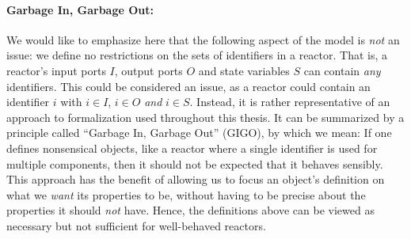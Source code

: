 \paragraph{Garbage In, Garbage Out:} 
We would like to emphasize here that the following aspect of the model is \emph{not} an issue:
we define no restrictions on the sets of identifiers in a reactor.
That is, a reactor's input ports $I$, output ports $O$ and state variables $S$ can contain \emph{any} identifiers.
This could be considered an issue, as a reactor could contain an identifier $i$ with $i \in I$, $i \in O$ \emph{and} $i \in S$.
Instead, it is rather representative of an approach to formalization used throughout this thesis.
It can be summarized by a principle called ``Garbage In, Garbage Out'' (GIGO), by which we mean:
If one defines nonsensical objects, like a reactor where a single identifier is used for multiple components, then it should not be expected that it behaves sensibly. 
This approach has the benefit of allowing us to focus an object's definition on what we \emph{want} its properties to be, without having to be precise about the properties it should \emph{not} have.
Hence, the definitions above can be viewed as necessary but not sufficient for well-behaved reactors.
